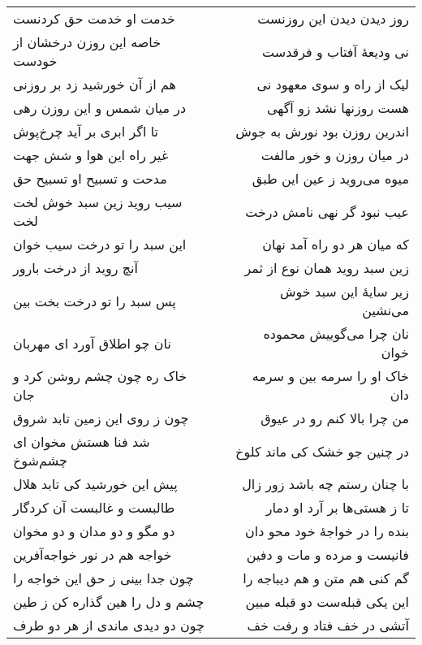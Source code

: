 \begin{center}
\begin{longtable}{l p{0.5cm} r}
\\
خدمت او خدمت حق کردنست
&&
روز دیدن دیدن این روزنست
\\
خاصه این روزن درخشان از خودست
&&
نی ودیعهٔ آفتاب و فرقدست
\\
هم از آن خورشید زد بر روزنی
&&
لیک از راه و سوی معهود نی
\\
در میان شمس و این روزن رهی
&&
هست روزنها نشد زو آگهی
\\
تا اگر ابری بر آید چرخ‌پوش
&&
اندرین روزن بود نورش به جوش
\\
غیر راه این هوا و شش جهت
&&
در میان روزن و خور مالفت
\\
مدحت و تسبیح او تسبیح حق
&&
میوه می‌روید ز عین این طبق
\\
سیب روید زین سبد خوش لخت لخت
&&
عیب نبود گر نهی نامش درخت
\\
این سبد را تو درخت سیب خوان
&&
که میان هر دو راه آمد نهان
\\
آنچ روید از درخت بارور
&&
زین سبد روید همان نوع از ثمر
\\
پس سبد را تو درخت بخت بین
&&
زیر سایهٔ این سبد خوش می‌نشین
\\
نان چو اطلاق آورد ای مهربان
&&
نان چرا می‌گوییش محموده خوان
\\
خاک ره چون چشم روشن کرد و جان
&&
خاک او را سرمه بین و سرمه دان
\\
چون ز روی این زمین تابد شروق
&&
من چرا بالا کنم رو در عیوق
\\
شد فنا هستش مخوان ای چشم‌شوخ
&&
در چنین جو خشک کی ماند کلوخ
\\
پیش این خورشید کی تابد هلال
&&
با چنان رستم چه باشد زور زال
\\
طالبست و غالبست آن کردگار
&&
تا ز هستی‌ها بر آرد او دمار
\\
دو مگو و دو مدان و دو مخوان
&&
بنده را در خواجهٔ خود محو دان
\\
خواجه هم در نور خواجه‌آفرین
&&
فانیست و مرده و مات و دفین
\\
چون جدا بینی ز حق این خواجه را
&&
گم کنی هم متن و هم دیباجه را
\\
چشم و دل را هین گذاره کن ز طین
&&
این یکی قبله‌ست دو قبله مبین
\\
چون دو دیدی ماندی از هر دو طرف
&&
آتشی در خف فتاد و رفت خف
\\
\end{longtable}
\end{center}
